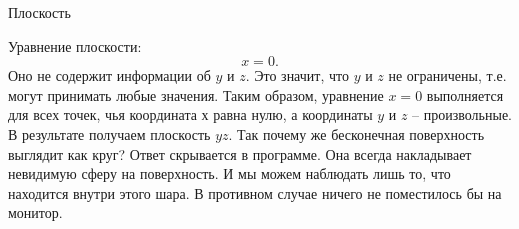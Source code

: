 \documentclass[ru]{./../../common/SurferDesc}%
\begin{document}
\footnotesize
%

\begin{surferPage}
  \begin{surferTitle}Плоскость\end{surferTitle}
   \begin{surferText}

Уравнение плоскости: \[x=0.\] Оно не содержит информации об $y$ и $z$. Это значит, что $y$ и $z$ не ограничены, т.е. могут принимать любые значения. Таким образом, уравнение $x=0$ выполняется для всех точек, чья координата $х$ равна нулю, а координаты $y$ и $z$ – произвольные. В результате получаем плоскость $yz$. 
\newline \newline
Так почему же бесконечная поверхность выглядит как круг? Ответ скрывается в программе. Она всегда накладывает невидимую сферу на поверхность. И мы можем наблюдать лишь то, что находится внутри этого шара. В противном случае ничего не поместилось бы на монитор.
     \end{surferText}
\end{surferPage}

\end{document}
